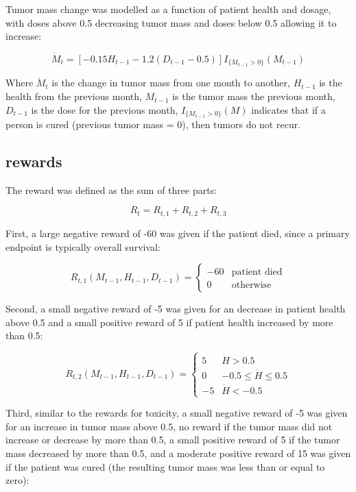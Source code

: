 \documentclass[12pt]{article}
\begin{document}
Tumor mass change was modelled as a function of patient health and dosage, with doses above 0.5 decreasing tumor mass and doses below 0.5 allowing it to increase:

\[
\dot{M}_{t} = [- 0.15 H_{t-1} - 1.2 (D_{t-1} - 0.5)] I_{\{M_{t-1} > 0\}}(M_{t-1})
\]

Where $\dot{M}_{t}$ is the change in tumor mass from one month to another,
$H_{t-1}$ is the health from the previous month,
$M_{t-1}$ is the tumor mass the previous month,
$D_{t-1}$ is the dose for the previous month,
$I_{\{M_{t-1} > 0\}}(M)$ indicates that if a person is cured (previous tumor mass = 0), then tumors do not recur.



\subsection{rewards} %
\label{sub:}

The reward was defined as the sum of three parts: 

\[
R_{t} = R_{t, 1} + R_{t, 2} + R_{t, 3}
\]

First, a large negative reward of -60 was given if the patient died, since a primary endpoint is typically overall survival:

\[
R_{t, 1}(M_{t-1}, H_{t-1}, D_{t-1}) = 
\begin{cases}
  -60 & \text{patient died} \\
  0 & \text{otherwise}
\end{cases}
\]

Second, a small negative reward of -5 was given for an decrease in patient health above 0.5 and a small positive reward of 5 if patient health increased by more than 0.5:

\[
R_{t, 2}(M_{t-1}, H_{t-1}, D_{t-1}) =  
\begin{cases}
  5 & \dot{H} > 0.5 \\
  0 & -0.5 \leq \dot{H} \leq 0.5 \\
  -5 & \dot{H} < -0.5
\end{cases}
\]

Third, similar to the rewards for toxicity, a small negative reward of -5 was given for an increase in tumor mass above 0.5, no reward if the tumor mass did not increase or decrease by more than 0.5, a small positive reward of 5 if the tumor mass decreased by more than 0.5, and a moderate positive reward of 15 was given if the patient was cured (the resulting tumor mass was less than or equal to zero):
\end{document}
